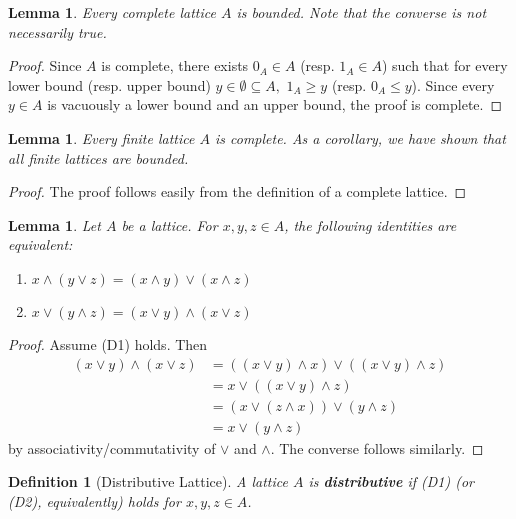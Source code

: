 \documentclass{article}
\newtheorem{lemma}[proposition]{Lemma}
\newtheorem{definition}[proposition]{Definition}
\newcommand{\meet}{\wedge}
\newcommand{\join}{\vee}
\begin{document}
\begin{lemma}
Every complete lattice $A$ is bounded. Note that the converse is not necessarily true.
\end{lemma}

\begin{proof}
Since $A$ is complete, there exists $0_A \in A$ (resp. $1_A \in A$) such that for every lower bound (resp. upper bound) $y \in \emptyset \subseteq A,$ $1_A \geq y$ (resp. $0_A \leq y$). Since every $y \in A$ is vacuously a lower bound and an upper bound, the proof is complete.
\end{proof}

\begin{lemma}
Every finite lattice $A$ is complete. As a corollary, we have shown that all finite lattices are bounded.
\end{lemma}

\begin{proof}
The proof follows easily from the definition of a complete lattice. 
\end{proof}

\begin{lemma}
Let $A$ be a lattice. For $x, y, z \in A$, the following identities are equivalent: 
\begin{enumerate}
    \item[D1.]{$x \meet (y \join z) = (x \meet y) \join (x \meet z)$}
    \item[D2.]{$x \join (y \meet z) = (x \join y) \meet (x \join z)$}
\end{enumerate}
\end{lemma}

\begin{proof}
Assume (D1) holds. Then 
\begin{align*}
(x \join y) \meet (x \join z) &= ((x \join y) \meet x) \join ((x \join y) \meet z) 
                           \\ &= x \join ((x \join y) \meet z)
                           \\ &= (x \join (z \meet x)) \join (y \meet z)
                           \\ &= x \join (y \meet z)
\end{align*}
by associativity/commutativity of $\join$ and $\meet$. The converse follows similarly.
\end{proof}

\begin{definition}[Distributive Lattice]
A lattice $A$ is \textbf{distributive} if (D1) (or (D2), equivalently) holds for $x, y, z \in A$.
\end{definition}
\end{document}
